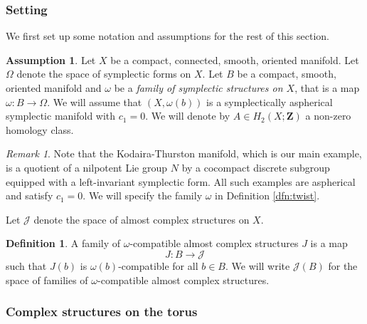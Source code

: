 \documentclass[11pt]{amsart}
\newcommand{\ZZ}{\mathbf{Z}}
\numberwithin{equation}{section}
\theoremstyle{definition}
\newtheorem{ass}[equation]{Assumption}
\newtheorem{dfn}[equation]{Definition}
\theoremstyle{remark}
\newtheorem{rmk}[equation]{Remark}
\begin{document}
\subsubsection{Setting}

We first set up some notation and assumptions for the rest of this section.

\begin{ass}\label{ass:1}
Let $X$ be a compact, connected, smooth, oriented manifold. Let $\Omega$ denote the space of symplectic forms on $X$. Let $B$ be a compact, smooth, oriented manifold and $\omega$ be a \emph{family of symplectic structures on $X$}, that is a map $\omega\colon B\to\Omega$. We will assume that $(X,\omega(b))$ is a symplectically aspherical symplectic manifold with $c_1=0$. We will denote by $A\in H_2(X;\ZZ)$ a non-zero homology class.
\end{ass}

\begin{rmk}
Note that the Kodaira-Thurston manifold, which is our main example, is a quotient of a nilpotent Lie group $N$ by a cocompact discrete subgroup equipped with a left-invariant symplectic form. All such examples are aspherical and satisfy $c_1=0$. We will specify the family $\omega$ in Definition \ref{dfn:twist}.
\end{rmk}

Let $\mathcal{J}$ denote the space of almost complex structures on $X$.

\begin{dfn}
A family of $\omega$-compatible almost complex structures $J$ is a map
\[J\colon B\to\mathcal{J}\]
such that $J(b)$ is $\omega(b)$-compatible for all $b\in B$. We will write $\mathcal{J}(B)$ for the space of families of $\omega$-compatible almost complex structures.
\end{dfn}

\subsubsection{Complex structures on the torus}\label{sct:torus}
\end{document}

